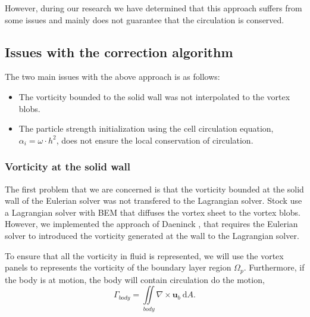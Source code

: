 However, during our research we have determined that this approach suffers from some issues and mainly does not guarantee that the circulation is conserved.

\subsection{Issues with the correction algorithm}
\label{subsec:hy_iwtca}
The two main issues with the above approach is as follows:

\begin{itemize}
\item The vorticity bounded to the solid wall was not interpolated to the vortex blobs. 
\item The particle strength initialization using the cell circulation equation, $\alpha_i = \omega \cdot h^2$, does not ensure the local conservation of circulation. %
\end{itemize}

\subsubsection{Vorticity at the solid wall}



The first problem that we are concerned is that the vorticity bounded at the solid wall of the Eulerian solver was not transfered to the Lagrangian solver. Stock \cite{Stock2010a} use a Lagrangian solver with BEM that diffuses the vortex sheet to the vortex blobs. However, we implemented the approach of Daeninck \cite{Daeninck2006}, that requires the Eulerian solver to introduced the vorticity generated at the wall to the Lagrangian solver.

To ensure that all the vorticity in fluid is represented, we will use the vortex panels to represents the vorticity of the boundary layer region $\Omega_p$. Furthermore, if the body is at motion, the body will contain circulation do the motion,
	\begin{equation}
	\Gamma_{body} = \iint\limits_{body} \nabla \times \mathbf{u}_b \ \mathrm{d} A.
	\end{equation}

